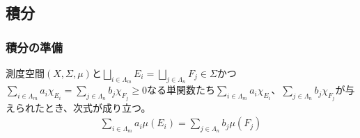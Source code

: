 \documentclass[dvipdfmx]{jsarticle}
\begin{document}
\subsection{積分}%
\subsubsection{積分の準備}%
\begin{thm}\label{4.6.1.1}
測度空間$(X,\varSigma,\mu)$と$\bigsqcup_{i \in \varLambda_{m}} E_{i} = \bigsqcup_{j \in \varLambda_{n}} F_{j} \in \varSigma$かつ$\sum_{i \in \varLambda_{m}} {a_{i}\chi_{E_{i}}} = \sum_{j \in \varLambda_{n}} {b_{j}\chi_{F_{j}}} \geq 0$なる単関数たち$\sum_{i \in \varLambda_{m}} {a_{i}\chi_{E_{i}}}$、$\sum_{j \in \varLambda_{n}} {b_{j}\chi_{F_{j}}}$が与えられたとき、次式が成り立つ。
\begin{align*}
\sum_{i \in \varLambda_{m}} {a_{i}\mu\left( E_{i} \right)} = \sum_{j \in \varLambda_{n}} {b_{j}\mu\left( F_{j} \right)}
\end{align*}
\end{thm}
\end{document}

